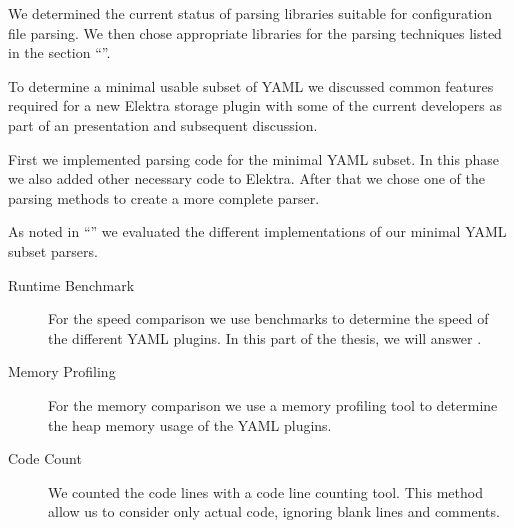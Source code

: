 \begin{description}[style=multiline, leftmargin=3.2cm, font=\bfseries]

  \item[Literature Review] We determined the current status of parsing libraries suitable for configuration file parsing. We then chose appropriate libraries for the parsing techniques listed in the section “”.

  \item[Discussion] To determine a minimal usable subset of YAML we discussed common features required for a new Elektra storage plugin with some of the current developers as part of an presentation and subsequent discussion.

  \item[Implementation] First we implemented parsing code for the minimal YAML subset. In this phase we also added other necessary code to Elektra. After that we chose one of the parsing methods to create a more complete  parser.

  \item[Comparison] As noted in “” we evaluated the different implementations of our minimal YAML subset parsers.

  \begin{description}
    \item[Runtime Benchmark] For the speed comparison we use benchmarks to determine the speed of the different YAML plugins. In this part of the thesis, we will answer .

    \item[Memory Profiling] For the memory comparison we use a memory profiling tool to determine the heap memory usage of the YAML plugins.

    \item[Code Count] We counted the code lines with a code line counting tool. This method allow us to consider only actual code, ignoring blank lines and comments.
  \end{description}

\end{description}
